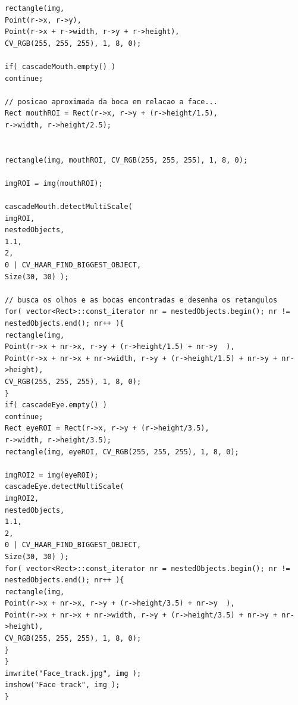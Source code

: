 \documentclass{article}
\begin{document}
\begin{lstlisting}
rectangle(img,  
Point(r->x, r->y),  
Point(r->x + r->width, r->y + r->height),  
CV_RGB(255, 255, 255), 1, 8, 0);

if( cascadeMouth.empty() )
continue;

// posicao aproximada da boca em relacao a face...
Rect mouthROI = Rect(r->x, r->y + (r->height/1.5), 
r->width, r->height/2.5);


rectangle(img, mouthROI, CV_RGB(255, 255, 255), 1, 8, 0);

imgROI = img(mouthROI);

cascadeMouth.detectMultiScale(
imgROI,
nestedObjects,
1.1,
2,
0 | CV_HAAR_FIND_BIGGEST_OBJECT,
Size(30, 30) );

// busca os olhos e as bocas encontradas e desenha os retangulos
for( vector<Rect>::const_iterator nr = nestedObjects.begin(); nr != nestedObjects.end(); nr++ ){
rectangle(img,  
Point(r->x + nr->x, r->y + (r->height/1.5) + nr->y  ),  
Point(r->x + nr->x + nr->width, r->y + (r->height/1.5) + nr->y + nr->height),  
CV_RGB(255, 255, 255), 1, 8, 0);
}
if( cascadeEye.empty() )
continue;
Rect eyeROI = Rect(r->x, r->y + (r->height/3.5), 
r->width, r->height/3.5);
rectangle(img, eyeROI, CV_RGB(255, 255, 255), 1, 8, 0);

imgROI2 = img(eyeROI);
cascadeEye.detectMultiScale(
imgROI2,
nestedObjects,
1.1,
2,
0 | CV_HAAR_FIND_BIGGEST_OBJECT,
Size(30, 30) );
for( vector<Rect>::const_iterator nr = nestedObjects.begin(); nr != nestedObjects.end(); nr++ ){
rectangle(img,  
Point(r->x + nr->x, r->y + (r->height/3.5) + nr->y  ),  
Point(r->x + nr->x + nr->width, r->y + (r->height/3.5) + nr->y + nr->height),  
CV_RGB(255, 255, 255), 1, 8, 0);
}
}
imwrite("Face_track.jpg", img );
imshow("Face track", img );
}
	\end{lstlisting}	
\end{document}
